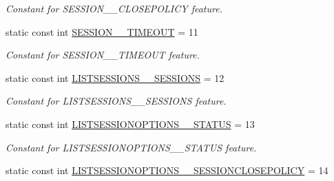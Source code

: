 \begin{DoxyCompactItemize}
\begin{DoxyCompactList}\small\item\em Constant for SESSION\_\-\_\-CLOSEPOLICY feature. \item\end{DoxyCompactList}\item 
\hypertarget{classUMS__Data_1_1UMS__DataPackage_aa31d939cb0a505b1181920b03c383f80}{
static const int \hyperlink{classUMS__Data_1_1UMS__DataPackage_aa31d939cb0a505b1181920b03c383f80}{SESSION\_\-\_\-TIMEOUT} = 11}
\label{classUMS__Data_1_1UMS__DataPackage_aa31d939cb0a505b1181920b03c383f80}

\begin{DoxyCompactList}\small\item\em Constant for SESSION\_\-\_\-TIMEOUT feature. \item\end{DoxyCompactList}\item 
\hypertarget{classUMS__Data_1_1UMS__DataPackage_a46d8bc393dd6021683af369f848fa217}{
static const int \hyperlink{classUMS__Data_1_1UMS__DataPackage_a46d8bc393dd6021683af369f848fa217}{LISTSESSIONS\_\-\_\-SESSIONS} = 12}
\label{classUMS__Data_1_1UMS__DataPackage_a46d8bc393dd6021683af369f848fa217}

\begin{DoxyCompactList}\small\item\em Constant for LISTSESSIONS\_\-\_\-SESSIONS feature. \item\end{DoxyCompactList}\item 
\hypertarget{classUMS__Data_1_1UMS__DataPackage_a7df99068a093a23a763eee990d488d46}{
static const int \hyperlink{classUMS__Data_1_1UMS__DataPackage_a7df99068a093a23a763eee990d488d46}{LISTSESSIONOPTIONS\_\-\_\-STATUS} = 13}
\label{classUMS__Data_1_1UMS__DataPackage_a7df99068a093a23a763eee990d488d46}

\begin{DoxyCompactList}\small\item\em Constant for LISTSESSIONOPTIONS\_\-\_\-STATUS feature. \item\end{DoxyCompactList}\item 
\hypertarget{classUMS__Data_1_1UMS__DataPackage_a528b75440742b72908bd7920ae50ef64}{
static const int \hyperlink{classUMS__Data_1_1UMS__DataPackage_a528b75440742b72908bd7920ae50ef64}{LISTSESSIONOPTIONS\_\-\_\-SESSIONCLOSEPOLICY} = 14}
\label{classUMS__Data_1_1UMS__DataPackage_a528b75440742b72908bd7920ae50ef64}


\end{DoxyCompactItemize}
